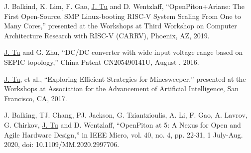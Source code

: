 {\begin{pubdetails}
\item J. Balkind, K. Lim, F. Gao, \underline{J. Tu} and D. Wentzlaff, ``OpenPiton+Ariane: The First Open-Source, SMP Linux-booting RISC-V System Scaling From One to Many Cores,'' presented at the Workshops at Third Workshop on Computer Architecture Research with RISC-V (CARRV), Phoenix, AZ, 2019.\\
\item \underline{J. Tu} and G. Zhu, ``DC/DC converter with wide input voltage range based on SEPIC topology,'' China Patent CN205490141U, August , 2016.\\
\item \underline{J. Tu}, et al., ``Exploring Efficient Strategies for Minesweeper,'' presented at the Workshops at Association for the Advancement of Artificial Intelligence, San Francisco, CA, 2017.\\
\item J. Balking, TJ. Chang, PJ. Jackson, G. Tziantzioulis, A. Li, F. Gao, A. Lavrov, G. Chirkov, \underline{J. Tu} and D. Wentzlaff,  ``OpenPiton at 5: A Nexus for Open and Agile Hardware Design,'' in IEEE Micro, vol. 40, no. 4, pp. 22-31, 1 July-Aug. 2020, doi: 10.1109/MM.2020.2997706. \\
\end{pubdetails}
}

\def\sectionTeaching{%
\section{Teaching Experience}
\techexp{Intel REU} {Research Experience for Undergrads (REU)}{2022}
{Student Mentor} {Prof. David Wentzlaff}
\techexp{\liningnums{ECE203}} {Electronic Circuit Design Analysis and Implementation}{2022}
{Teaching Assistant} {Dr. Hossein Valavi}
\techexp{\liningnums{ELE115}} {Introduction to Computing: Programming Autonomous Vehicles}{2020}
{Head Teaching Assistant} {Prof. David Wentzlaff}
}

